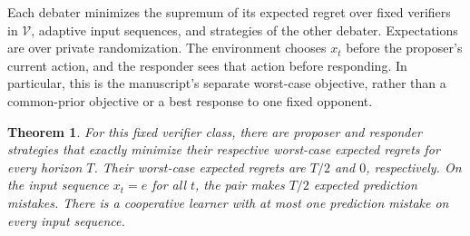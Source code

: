 \documentclass[11pt]{article}
\newtheorem{theorem}{Theorem}
\newcommand{\V}{\mathcal V}
\begin{document}
Each debater minimizes the supremum of its expected regret over fixed
verifiers in $\V$, adaptive input sequences, and strategies of the other
debater. Expectations are over private randomization. The environment
chooses $x_t$ before the proposer's current action, and the responder sees
that action before responding. In particular, this is the manuscript's
separate worst-case objective, rather than a common-prior objective or a
best response to one fixed opponent.

\begin{theorem}
For this fixed verifier class, there are proposer and responder strategies
that exactly minimize their respective worst-case expected regrets for
every horizon $T$. Their worst-case expected regrets are $T/2$ and $0$,
respectively. On the input sequence $x_t=e$ for all $t$, the pair makes
$T/2$ expected prediction mistakes. There is a cooperative learner with
at most one prediction mistake on every input sequence.
\end{theorem}
\end{document}
